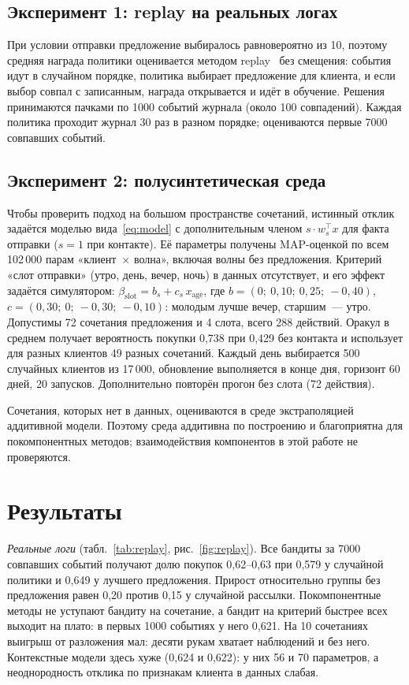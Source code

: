 \documentclass{misisarticle}
\begin{document}
\subsection{Эксперимент 1: replay на реальных логах}

При условии отправки предложение выбиралось равновероятно из 10, поэтому средняя награда политики оценивается методом replay~\cite{li2011} без смещения: события идут в случайном порядке, политика выбирает предложение для клиента, и если выбор совпал с записанным, награда открывается и идёт в обучение. Решения принимаются пачками по 1000 событий журнала (около 100 совпадений). Каждая политика проходит журнал 30 раз в разном порядке; оцениваются первые 7000 совпавших событий.

\subsection{Эксперимент 2: полусинтетическая среда}

Чтобы проверить подход на большом пространстве сочетаний, истинный отклик задаётся моделью вида~\eqref{eq:model} с дополнительным членом $s \cdot w_s^{\top} x$ для факта отправки ($s = 1$ при контакте). Её параметры получены MAP-оценкой по всем 102\,000 парам «клиент~$\times$ волна», включая волны без предложения. Критерий «слот отправки» (утро, день, вечер, ночь) в данных отсутствует, и его эффект задаётся симулятором: $\beta_{\mathrm{slot}} = b_s + c_s\, x_{\mathrm{age}}$, где $b = (0;\ 0{,}10;\ 0{,}25;\ -0{,}40)$, $c = (0{,}30;\ 0;\ -0{,}30;\ -0{,}10)$: молодым лучше вечер, старшим~--- утро. Допустимы 72 сочетания предложения и 4 слота, всего 288 действий. Оракул в среднем получает вероятность покупки 0,738 при 0,429 без контакта и использует для разных клиентов 49 разных сочетаний. Каждый день выбирается 500 случайных клиентов из 17\,000, обновление выполняется в конце дня, горизонт 60 дней, 20 запусков. Дополнительно повторён прогон без слота (72 действия).

Сочетания, которых нет в данных, оцениваются в среде экстраполяцией аддитивной модели. Поэтому среда аддитивна по построению и благоприятна для покомпонентных методов; взаимодействия компонентов в этой работе не проверяются.

\section{Результаты}

\textit{Реальные логи} (табл.~\ref{tab:replay}, рис.~\ref{fig:replay}). Все бандиты за 7000 совпавших событий получают долю покупок 0,62--0,63 при 0,579 у случайной политики и 0,649 у лучшего предложения. Прирост относительно группы без предложения равен 0,20 против 0,15 у случайной рассылки. Покомпонентные методы не уступают бандиту на сочетание, а бандит на критерий быстрее всех выходит на плато: в первых 1000 событиях у него 0,621. На 10 сочетаниях выигрыш от разложения мал: десяти рукам хватает наблюдений и без него. Контекстные модели здесь хуже (0,624 и 0,622): у них 56 и 70 параметров, а неоднородность отклика по признакам клиента в данных слабая.
\end{document}
